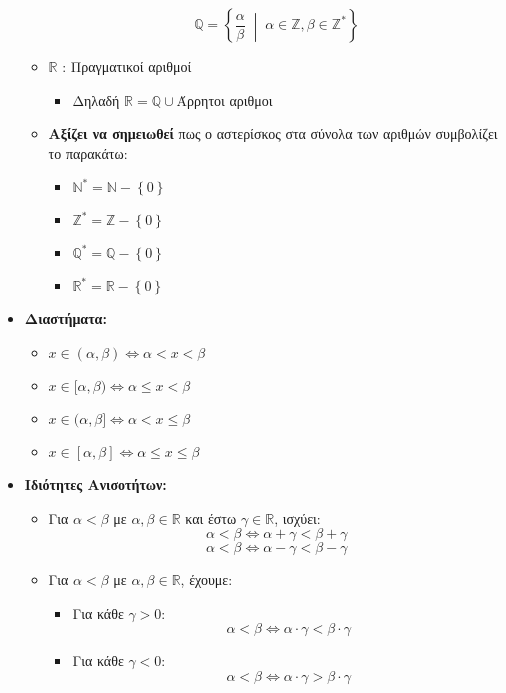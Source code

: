 \begin{itemize}[leftmargin=1em]
\begin{itemize}
        \[
        \mathbb{Q} = \left\{ \frac{\alpha}{\beta} \;\middle|\; \alpha \in \mathbb{Z}, \beta \in \mathbb{Z}^* \right\}
        \]

        \item $\mathbb{R}$ : Πραγματικοί αριθμοί
        \begin{itemize}
            \item Δηλαδή $\mathbb{R} = \mathbb{Q}\cup$Άρρητοι αριθμοι
        \end{itemize}

        \item \textbf{Αξίζει να σημειωθεί} πως ο αστερίσκος στα σύνολα των αριθμών συμβολίζει το παρα\-κάτω:
        \begin{itemize}
            \item $\mathbb{N}^* = \mathbb{N} - \left\{ 0 \right\}$
            \item $\mathbb{Z}^* = \mathbb{Z} - \left\{ 0 \right\}$
            \item $\mathbb{Q}^* = \mathbb{Q} - \left\{ 0 \right\}$
            \item $\mathbb{R}^* = \mathbb{R} - \left\{ 0 \right\}$
        \end{itemize}


    \end{itemize}

    \item \textbf{Διαστήματα:}
    \begin{itemize}
        \item $x \in ( \alpha, \beta) \iff \alpha < x < \beta$
        \item $x \in [ \alpha, \beta) \iff \alpha \leq x < \beta$
        \item $x \in ( \alpha, \beta] \iff \alpha < x \leq \beta$
        \item $x \in [ \alpha, \beta] \iff \alpha \leq x \leq \beta$
    \end{itemize}

\newpage

    \item \textbf{Ιδιότητες Ανισοτήτων:}
    \begin{itemize}
        \item Για $\alpha < \beta$ με $\alpha, \beta \in \mathbb{R}$ και έστω $\gamma \in \mathbb{R}$, ισχύει:
        \[
        \alpha < \beta \iff \alpha + \gamma < \beta + \gamma
        \]
        \[
        \alpha < \beta \iff \alpha - \gamma < \beta - \gamma
        \]

        \item Για $\alpha < \beta$ με $\alpha, \beta \in \mathbb{R}$, έχουμε:
        \begin{itemize}
            \item Για κάθε $\gamma > 0$:
            \[
            \alpha < \beta \iff \alpha \cdot \gamma < \beta \cdot \gamma
            \]
            \item Για κάθε $\gamma < 0$:
            \[
            \alpha < \beta \iff \alpha \cdot \gamma > \beta \cdot \gamma
            \]
        \end{itemize}


\end{itemize}
\end{itemize}
